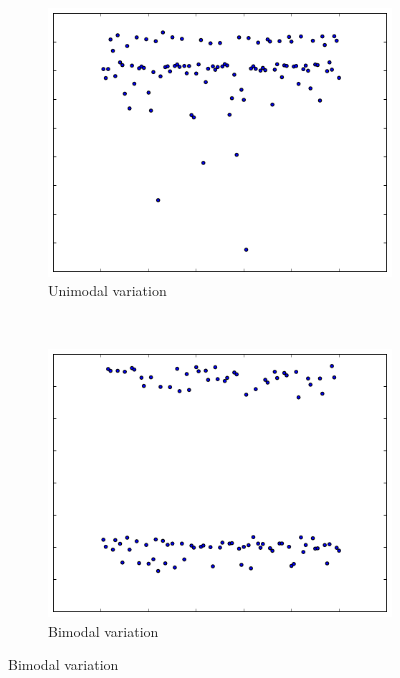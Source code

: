 \documentclass[conference]{IEEEtran}
\begin{document}
\begin{figure}
\centering

\begin{subfigure}{0.22\textwidth}
    \centering
    \includegraphics[width=\textwidth]{figures/fig1/simple_branchsum_fast}
    \caption{Unimodal variation}
\end{subfigure}%
~
\begin{subfigure}{0.22\textwidth}
    \centering
    \includegraphics[width=\textwidth]{figures/fig1/bimodal_branchsum}
    \caption{Bimodal variation}
\end{subfigure}


\end{figure}
\end{document}
